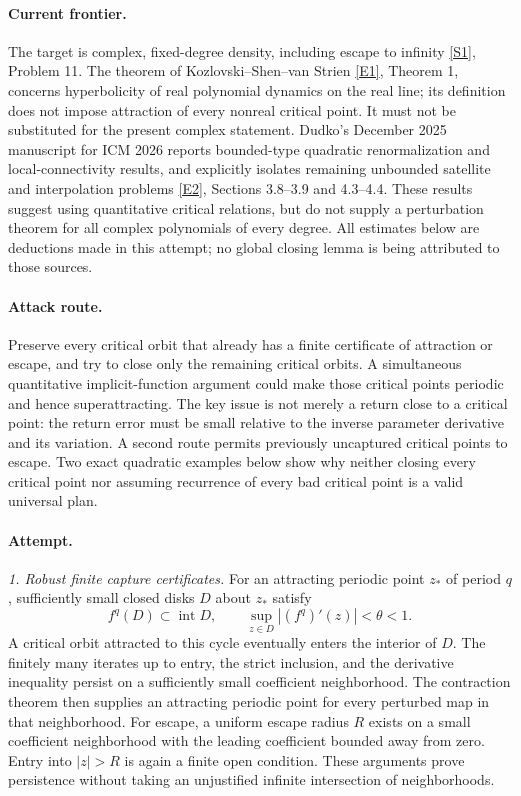 \documentclass[11pt,a4paper]{article}
\newcommand{\sref}[2]{\hyperlink{source:#1:#2}{[S#2]}}
\newcommand{\eref}[2]{\hyperlink{extra:#1:#2}{[E#2]}}
\begin{document}
\paragraph{Current frontier.}
The target is complex, fixed-degree density, including escape to infinity
\sref{statement}{1}, Problem 11. The theorem of Kozlovski--Shen--van Strien
\eref{statement}{1}, Theorem 1, concerns hyperbolicity of real polynomial dynamics
on the real line; its definition does not impose attraction of every
nonreal critical point. It must not be substituted for the present
complex statement. Dudko's December 2025 manuscript for ICM 2026 reports
bounded-type quadratic renormalization and local-connectivity results,
and explicitly isolates remaining unbounded satellite and interpolation
problems \eref{statement}{2}, Sections 3.8--3.9 and 4.3--4.4.
These results suggest using quantitative critical relations, but do not
supply a perturbation theorem for all complex polynomials of every degree.
All estimates below are deductions made in this attempt; no global closing
lemma is being attributed to those sources.

\paragraph{Attack route.}
Preserve every critical orbit that already has a finite certificate of
attraction or escape, and try to close only the remaining critical orbits.
A simultaneous quantitative implicit-function argument could make those
critical points periodic and hence superattracting. The key issue is not
merely a return close to a critical point: the return error must be small
relative to the inverse parameter derivative and its variation. A second
route permits previously uncaptured critical points to escape. Two exact
quadratic examples below show why neither closing every critical point nor
assuming recurrence of every bad critical point is a valid universal plan.

\paragraph{Attempt.}
\textit{1. Robust finite capture certificates.}
For an attracting periodic point $z_*$ of period $q$, sufficiently small
closed disks $D$ about $z_*$ satisfy
\[
 f^q(D)\subset\operatorname{int}D,
 \qquad \sup_{z\in D}|(f^q)'(z)|<\theta<1.                 \tag{215.1}
\]
A critical orbit attracted to this cycle eventually enters the interior
of $D$. The finitely many iterates up to entry, the strict inclusion, and
the derivative inequality persist on a sufficiently small coefficient
neighborhood. The contraction theorem then supplies an attracting
periodic point for every perturbed map in that neighborhood. For escape,
a uniform escape radius $R$ exists on a small coefficient neighborhood
with the leading coefficient bounded away from zero. Entry into
$|z|>R$ is again a finite open condition. These arguments prove persistence
without taking an unjustified infinite intersection of neighborhoods.
\end{document}
